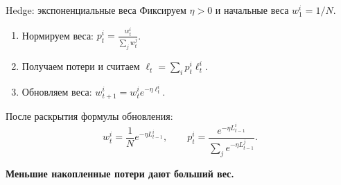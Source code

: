 \documentclass[11pt,aspectratio=169]{beamer}
\begin{document}
\begin{frame}{Hedge: экспоненциальные веса}
  Фиксируем $\eta>0$ и начальные веса $w_1^i=1/N$.
  \begin{enumerate}
    \item Нормируем веса: $\displaystyle p_t^i=\frac{w_t^i}{\sum_j w_t^j}$.
    \item Получаем потери и считаем $\displaystyle\ell_t=\sum_i p_t^i\ell_t^i$.
    \item Обновляем веса: $\displaystyle w_{t+1}^i=w_t^i e^{-\eta\ell_t^i}$.
  \end{enumerate}
  \medskip
  После раскрытия формулы обновления:
  \[
    w_t^i=\frac1N e^{-\eta L_{t-1}^i},\qquad
    p_t^i=\frac{e^{-\eta L_{t-1}^i}}{\sum_j e^{-\eta L_{t-1}^j}}.
  \]
  \par\medskip\textbf{Меньшие накопленные потери дают больший вес.}
\end{frame}

\end{document}
